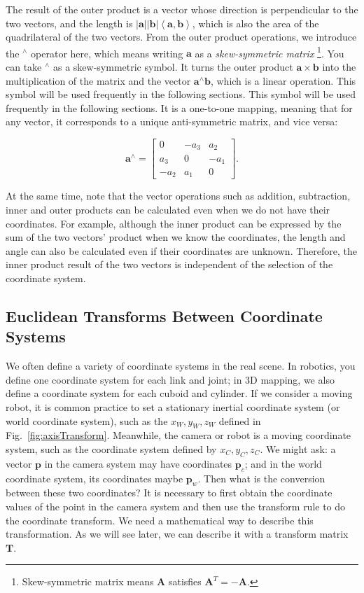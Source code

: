 The result of the outer product is a vector whose direction is perpendicular to the two vectors, and the length is $ \left | \mathbf{a} \right | \left | \mathbf{b} \right | \left \langle { \mathbf {a}, \mathbf {b}} \right \rangle  $, which is also the area of the quadrilateral of the two vectors. From the outer product operations, we introduce the $ ^ \wedge $ operator here, which means writing $ \mathbf{a} $ as a \textit {skew-symmetric matrix} \footnote{Skew-symmetric matrix means $ \mathbf{A} $ satisfies $ \mathbf{A}^T=- \mathbf{A}$. }. You can take $ ^ \wedge $ as a skew-symmetric symbol. It turns the outer product $ \mathbf{a} \times  \mathbf{b} $ into the multiplication of the matrix and the vector $ { \mathbf{a}^ \wedge } \mathbf{b} $, which is a linear operation. This symbol will be used frequently in the following sections. This symbol will be used frequently in the following sections. It is a one-to-one mapping, meaning that for any vector, it corresponds to a unique anti-symmetric matrix, and vice versa:

\begin{equation}
\mathbf{a}^\wedge = \left[ {\begin{array}{*{20}{c}}
	0&{-{a_3}}&{{a_2}}\\  
	{{a_3}}&0&{ - {a_1}}\\
	{ - {a_2}}&{{a_1}}&0
	\end{array}} \right].
\end{equation}

At the same time, note that the vector operations such as addition, subtraction, inner and outer products can be calculated even when we do not have their coordinates. For example, although the inner product can be expressed by the sum of the two vectors' product when we know the coordinates, the length and angle can also be calculated even if their coordinates are unknown. Therefore, the inner product result of the two vectors is independent of the selection of the coordinate system.

\subsection{Euclidean Transforms Between Coordinate Systems}
We often define a variety of coordinate systems in the real scene. In robotics, you define one coordinate system for each link and joint; in 3D mapping, we also define a coordinate system for each cuboid and cylinder. If we consider a moving robot, it is common practice to set a stationary inertial coordinate system (or world coordinate system), such as the $x_W, y_W, z_W$ defined in Fig.~\ref{fig:axisTransform}. Meanwhile, the camera or robot is a moving coordinate system, such as the coordinate system defined by $x_C, y_C, z_C$. We might ask: a vector $\mathbf{p}$ in the camera system may have coordinates $\mathbf{p}_c$; and in the world coordinate system, its coordinates maybe $ \mathbf{p}_w$. Then what is the conversion between these two coordinates? It is necessary to first obtain the coordinate values of the point in the camera system and then use the transform rule to do the coordinate transform. We need a mathematical way to describe this transformation. As we will see later, we can describe it with a transform matrix $\mathbf{T}$.

